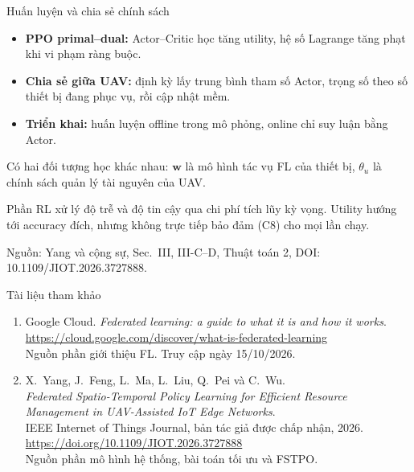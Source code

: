 \documentclass[aspectratio=169,11pt]{beamer}
\newcommand{\source}[1]{\par\vfill{\tiny\color{Muted}Nguồn: #1\par}}
\newcommand{\paperref}[1]{\source{Yang và cộng sự, Sec.~#1, DOI: 10.1109/JIOT.2026.3727888.}}
\begin{document}
\begin{frame}{Huấn luyện và chia sẻ chính sách}
  \begin{itemize}
    \setlength{\itemsep}{0.65em}
    \item \textbf{PPO primal--dual:} Actor--Critic học tăng utility, hệ số Lagrange tăng phạt khi vi phạm ràng buộc.
    \item \textbf{Chia sẻ giữa UAV:} định kỳ lấy trung bình tham số Actor, trọng số theo số thiết bị đang phục vụ, rồi cập nhật mềm.
    \item \textbf{Triển khai:} huấn luyện offline trong mô phỏng, online chỉ suy luận bằng Actor.
  \end{itemize}
  \vspace{0.25cm}
  {\small Có hai đối tượng học khác nhau: $\mathbf w$ là mô hình tác vụ FL của thiết bị, $\theta_u$ là chính sách quản lý tài nguyên của UAV.}
  \par{\footnotesize Phần RL xử lý độ trễ và độ tin cậy qua chi phí tích lũy kỳ vọng. Utility hướng tới accuracy đích, nhưng không trực tiếp bảo đảm (C8) cho mọi lần chạy.}
  \paperref{III, III-C--D, Thuật toán 2}
\end{frame}

\begin{frame}{Tài liệu tham khảo}
  \begin{enumerate}
    \setlength{\itemsep}{1em}
    \item Google Cloud. \emph{Federated learning: a guide to what it is and how it works}.\\
      {\footnotesize\url{https://cloud.google.com/discover/what-is-federated-learning}}\\
      {\footnotesize Nguồn phần giới thiệu FL. Truy cập ngày 15/10/2026.}
    \item X.~Yang, J.~Feng, L.~Ma, L.~Liu, Q.~Pei và C.~Wu.\\
      \emph{Federated Spatio-Temporal Policy Learning for Efficient Resource Management in UAV-Assisted IoT Edge Networks}.\\
      IEEE Internet of Things Journal, bản tác giả được chấp nhận, 2026.\\
      {\footnotesize\url{https://doi.org/10.1109/JIOT.2026.3727888}}\\
      {\footnotesize Nguồn phần mô hình hệ thống, bài toán tối ưu và FSTPO.}
  \end{enumerate}
\end{frame}
\end{document}
